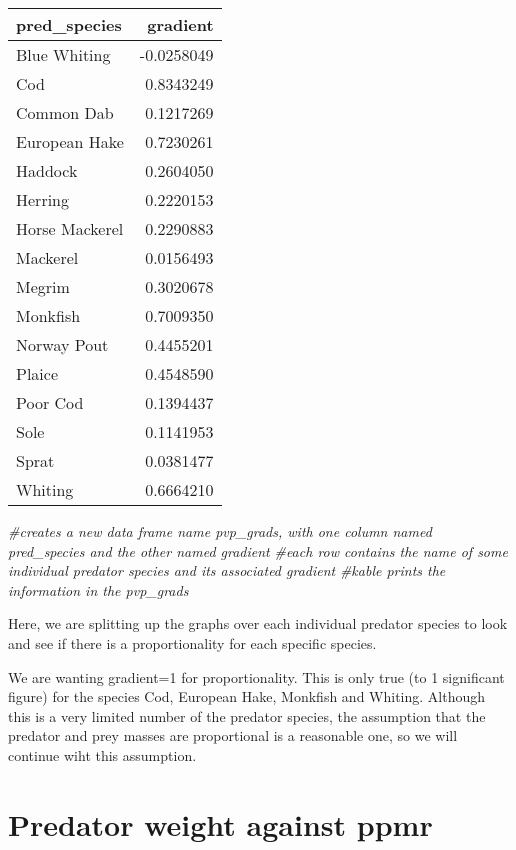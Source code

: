 \documentclass[
]{article}
\newenvironment{Shaded}{\begin{snugshade}}{\end{snugshade}}
\newcommand{\CommentTok}[1]{\textcolor[rgb]{0.56,0.35,0.01}{\textit{#1}}}
\begin{document}
\begin{longtable}[]{@{}lr@{}}
\toprule()
pred\_species & gradient \\
\midrule()
\endhead
Blue Whiting & -0.0258049 \\
Cod & 0.8343249 \\
Common Dab & 0.1217269 \\
European Hake & 0.7230261 \\
Haddock & 0.2604050 \\
Herring & 0.2220153 \\
Horse Mackerel & 0.2290883 \\
Mackerel & 0.0156493 \\
Megrim & 0.3020678 \\
Monkfish & 0.7009350 \\
Norway Pout & 0.4455201 \\
Plaice & 0.4548590 \\
Poor Cod & 0.1394437 \\
Sole & 0.1141953 \\
Sprat & 0.0381477 \\
Whiting & 0.6664210 \\
\bottomrule()
\end{longtable}

\begin{Shaded}
\begin{Highlighting}[]
\CommentTok{\#creates a new data frame name \textquotesingle{}pvp\_grads\textquotesingle{}, with one column named \textquotesingle{}pred\_species\textquotesingle{} and the other named \textquotesingle{}gradient\textquotesingle{}}
\CommentTok{\#each row contains the name of some individual predator species and its associated gradient}
\CommentTok{\#kable prints the information in the pvp\_grads}
\end{Highlighting}
\end{Shaded}

Here, we are splitting up the graphs over each individual predator
species to look and see if there is a proportionality for each specific
species.

We are wanting gradient=1 for proportionality. This is only true (to 1
significant figure) for the species Cod, European Hake, Monkfish and
Whiting. Although this is a very limited number of the predator species,
the assumption that the predator and prey masses are proportional is a
reasonable one, so we will continue wiht this assumption.

\hypertarget{predator-weight-against-ppmr}{%
\section{Predator weight against
ppmr}\label{predator-weight-against-ppmr}}
\end{document}
